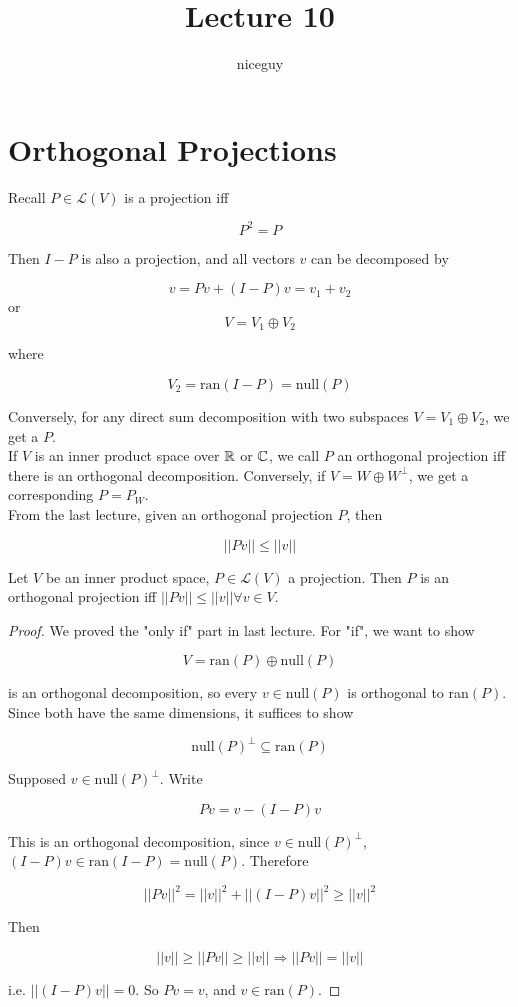 \documentclass[12pt]{article}
\author{niceguy}
\title{Lecture 10}
\begin{document}
\maketitle

\section{Orthogonal Projections}

Recall $P\in\mathcal L(V)$ is a projection iff

$$P^2 = P$$

Then $I - P$ is also a projection, and all vectors $v$ can be decomposed by

$$v = Pv + (I-P)v = v_1 + v_2$$
or
$$V = V_1 \oplus V_2$$

where

$$V_2 = \text{ran}(I-P) = \text{null}(P)$$

Conversely, for any direct sum decomposition with two subspaces $V = V_1 \oplus V_2$, we get a $P$. \\

If $V$ is an inner product space over $\mathbb{R}$ or $\mathbb{C}$, we call $P$ an orthogonal projection iff there is an orthogonal decomposition. Conversely, if $V = W \oplus W^\perp$, we get a corresponding $P = P_W$. \\

From the last lecture, given an orthogonal projection $P$, then

$$||Pv|| \leq ||v||$$

\begin{prop}
	Let $V$ be an inner product space, $P \in \mathcal L(V)$ a projection. Then $P$ is an orthogonal projection iff $||Pv|| \leq ||v|| \forall v \in V$.
\end{prop}

\begin{proof}
	We proved the "only if" part in last lecture. For "if", we want to show

	$$V = \text{ran}(P) \oplus \text{null}(P)$$

	is an orthogonal decomposition, so every $v \in \text{null}(P)$ is orthogonal to ran$(P)$. Since both have the same dimensions, it suffices to show

	$$\text{null}(P)^\perp \subseteq \text{ran}(P)$$

	Supposed $v \in \text{null}(P)^\perp$. Write

	$$Pv = v - (I - P)v$$

	This is an orthogonal decomposition, since $v \in \text{null}(P)^\perp$, $(I-P)v \in \text{ran}(I-P) = \text{null}(P)$. Therefore

	$$||Pv||^2 = ||v||^2 + ||(I-P)v||^2 \geq ||v||^2$$

	Then

	$$||v|| \geq ||Pv|| \geq ||v|| \Rightarrow ||Pv|| = ||v||$$

	i.e. $||(I-P)v|| = 0$. So $Pv = v$, and $v \in \text{ran}(P)$.
\end{proof}
\end{document}
